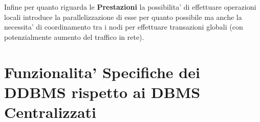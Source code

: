Infine per quanto riguarda le \textbf{Prestazioni} la possibilita' di effettuare operazioni locali introduce la parallelizzazione di esse per quanto possibile ma anche la necessita' di coordinamento tra i nodi per effettuare transazioni globali (con potenzialmente aumento del traffico in rete).

\section{Funzionalita' Specifiche dei DDBMS rispetto ai DBMS Centralizzati}
